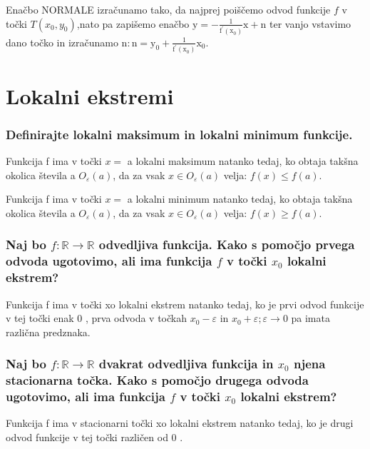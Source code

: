 \documentclass{article}
\begin{document}
Enačbo NORMALE izračunamo tako, da najprej poiščemo odvod funkcije $f$ v točki $T\left(x_{0}, y_{0}\right)$,nato pa zapišemo enačbo $\mathrm{y}=-\frac{1}{\mathrm{f}^{\prime}\left(\mathrm{x}_{0}\right)} \mathrm{x}+\mathrm{n}$ ter vanjo vstavimo dano točko in izračunamo $\mathrm{n}: \mathrm{n}=\mathrm{y}_{0}+\frac{1}{\mathrm{f}^{\prime}\left(\mathrm{x}_{0}\right)} \mathrm{x}_{0}$.


\section{Lokalni ekstremi}
\subsubsection*{Definirajte lokalni maksimum in lokalni minimum funkcije.}

Funkcija f ima v točki $x=$ a lokalni maksimum natanko tedaj, ko obtaja takšna okolica števila a $O_{\varepsilon}(a)$, da za vsak $x \in O_{\varepsilon}(a)$ velja: $f(x) \leq f(a)$.

Funkcija f ima v točki $x=$ a lokalni minimum natanko tedaj, ko obtaja takšna okolica števila a $O_{\varepsilon}(a)$, da za vsak $x \in O_{\varepsilon}(a)$ velja: $f(x) \geq f(a)$.

\subsubsection*{Naj bo $f: \mathbb{R} \rightarrow \mathbb{R}$ odvedljiva funkcija. Kako s pomočjo prvega odvoda ugotovimo, ali ima funkcija $f$ v točki $x_{0}$ lokalni ekstrem?}
 Funkcija f ima v točki xo lokalni ekstrem natanko tedaj, ko je prvi odvod funkcije v tej točki enak 0 , prva odvoda v točkah $x_{0}-\varepsilon$ in $x_{0}+\varepsilon ; \varepsilon \rightarrow 0$ pa imata različna predznaka.


\subsubsection*{Naj bo $f: \mathbb{R} \rightarrow \mathbb{R}$ dvakrat odvedljiva funkcija in $x_{0}$ njena stacionarna točka. Kako s pomočjo drugega odvoda ugotovimo, ali ima funkcija $f$ v točki $x_{0}$ lokalni ekstrem?}

Funkcija f ima v stacionarni točki xo lokalni ekstrem natanko tedaj, ko je drugi odvod funkcije v tej točki različen od 0 .

\section{\texorpdfstring{}{Ekstremi}}
\end{document}
